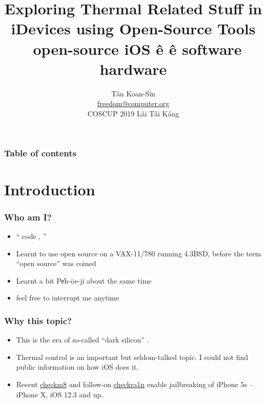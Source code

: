 \documentclass{beamer}
\begin{document}
\title{Exploring Thermal Related Stuff in iDevices using Open-Source Tools \\
  \ open-source     iOS ê      \^e software  hardware}

\author[freedom]{T\^an Koan-S\^in \\ \href{mailto:freedom@computer.org}{freedom@computer.org} \\ COSCUP 2019 Lâi Tâi Káng}

\begin{frame}
  \titlepage
\end{frame}

\begin{frame}
  \frametitle{Table of contents}
  \tableofcontents
\end{frame}

\section{Introduction}
\begin{frame}
  \frametitle{Who am I?}
  \begin{itemize}
    \item ``    code  ,    '' 
    \item Learnt to use open source on a VAX-11/780 running 4.3BSD, before the term ``open source'' was coined
    \item Learnt a bit Pe̍h-ōe-jī about the same time
    \item feel free to interrupt me anytime
  \end{itemize}
\end{frame}

\begin{frame}
  \frametitle{Why this topic?}
  \begin{itemize}
  \item This is the era of so-called ``dark silicon'' \cite{Esmaeilzadeh:2011:DSE:2000064.2000108}.
  \item Thermal control is an important but seldom-talked topic. I could not find public information on how iOS does it.
  \item Recent \href{https://github.com/axi0mX/ipwndfu}{checkm8} \cite{checkm8} and follow-on \href{https://checkra.in/}{checkra1n} \cite{checkra1n} enable jailbreaking of iPhone 5s – iPhone X, iOS 12.3 and up.
  \end{itemize}
\end{frame}
\end{document}
